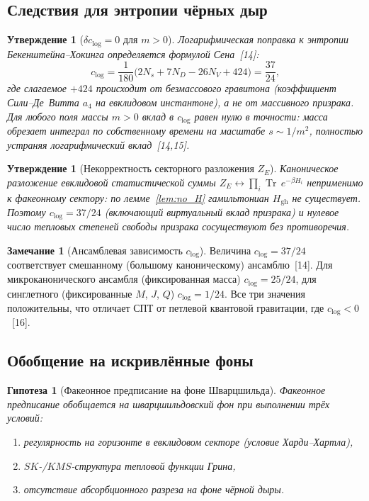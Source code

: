 \documentclass[12pt,a4paper]{article}
\newcommand{\Tr}{\operatorname{Tr}}
\theoremstyle{plain}
\newtheorem{proposition}[theorem]{Утверждение}
\newtheorem{conjecture}[theorem]{Гипотеза}
\theoremstyle{definition}
\newtheorem{remark}[theorem]{Замечание}
\begin{document}
\subsection{Следствия для энтропии чёрных дыр}

\begin{proposition}[$\delta c_{\log} = 0$ для $m > 0$]%
\label{prop:clog}
Логарифмическая поправка к энтропии Бекенштейна--Хокинга определяется
формулой Сена~[14]:
\begin{equation}\label{eq:clog}
  c_{\log} = \frac{1}{180}\bigl(2N_s + 7N_D - 26N_V + 424\bigr)
  = \frac{37}{24},
\end{equation}
где слагаемое $+424$ происходит от безмассового гравитона (коэффициент
Сили--Де~Витта $a_4$ на евклидовом инстантоне), а не от массивного
призрака. Для любого поля массы $m > 0$ вклад в $c_{\log}$ равен
нулю в точности: масса обрезает интеграл по собственному времени
на масштабе $s \sim 1/m^2$, полностью устраняя логарифмический
вклад~[14,15].
\end{proposition}

\begin{proposition}[Некорректность секторного разложения $Z_E$]%
\label{prop:ZE}
Каноническое разложение евклидовой статистической суммы
$Z_E \leftrightarrow \prod_i \Tr\,e^{-\beta H_i}$
неприменимо к факеонному сектору: по лемме~\ref{lem:no_H}
гамильтониан $H_{\mathrm{gh}}$ не существует. Поэтому
$c_{\log} = 37/24$ (включающий виртуальный вклад призрака)
и нулевое число тепловых степеней свободы призрака сосуществуют
без противоречия.
\end{proposition}

\begin{remark}[Ансамблевая зависимость $c_{\log}$]%
\label{rem:ensemble}
Величина $c_{\log} = 37/24$ соответствует смешанному (большому
каноническому) ансамблю~[14]. Для микроканонического ансамбля
(фиксированная масса) $c_{\log} = 25/24$, для синглетного (фиксированные
$M$, $J$, $Q$) $c_{\log} = 1/24$. Все три значения положительны,
что отличает СПТ от петлевой квантовой гравитации, где $c_{\log} < 0$~[16].
\end{remark}

\subsection{Обобщение на искривлённые фоны}

\begin{conjecture}[Факеонное предписание на фоне Шварцшильда]%
\label{conj:curved}
Факеонное предписание обобщается на шварцшильдовский фон при выполнении
трёх условий:
\begin{enumerate}[label=(\alph*)]
  \item регулярность на горизонте в евклидовом секторе (условие
    Харди--Хартла),
  \item $SK$-/$KMS$-структура тепловой функции Грина,
  \item отсутствие абсорбционного разреза на фоне чёрной дыры.
\end{enumerate}
\end{conjecture}
\end{document}
